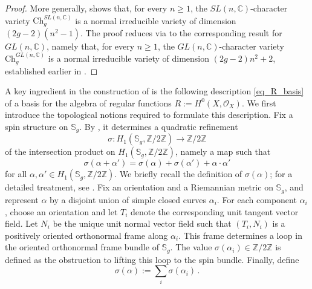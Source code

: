 \documentclass[12pt,letterpaper, reqno]{amsart}
\theoremstyle{defstyle} \newtheorem{definition}[theorem]{Definition}
\theoremstyle{remark}
\numberwithin{equation}{section}
\numberwithin{figure}{section}
\newcommand{\CC} {\mathbb{C}}
\newcommand{\bS} {\mathbb{S}}
\newcommand{\ZZ} {\mathbb{Z}}
\begin{document}
\begin{proof}
More generally, \cite[\S 2.2]{bellamy2023symplectic} shows that, for every $n \geq 1$, the $SL(n,\CC)$-character variety $\mathrm{Ch}_g^{SL(n,\CC)}$ is a normal irreducible variety of dimension $(2g-2)(n^2-1)$. The proof reduces via \cite[Lemma 2.3]{bellamy2023symplectic} 
to the corresponding result for $GL(n,\CC)$, namely that, for every $n \geq 1$, the $GL(n,\CC)$-character variety $\mathrm{Ch}_g^{GL(n,\CC)}$ is a normal irreducible variety of dimension $(2g-2)n^2+2$, established earlier in \cite[Theorem~11.1]{simpson1994moduliII}.
\end{proof}


A key ingredient in the construction of \cite{ayilliath2025geometric} is the following description \eqref{eq_R_basis} of a basis for the algebra of regular functions $R:=H^0(X,\mathcal O_X)$. We first introduce the topological notions required to formulate this description.
Fix a spin structure on $\bS_g$. By \cite{johson1980spin}, it determines a quadratic refinement 
\[ \sigma: H_1(\bS_g, \ZZ/2\ZZ) \rightarrow \ZZ/2\ZZ\] 
of the intersection product on $H_1(\bS_g, \ZZ/2\ZZ)$, namely a map such that
\[ \sigma(\alpha+\alpha')=\sigma(\alpha)+\sigma(\alpha')+\alpha \cdot \alpha'\]
for all $\alpha, \alpha' \in H_1(\bS_g, \ZZ/2\ZZ)$.
We briefly recall the definition of $\sigma(\alpha)$; for a detailed treatment, see \cite{johson1980spin}. Fix an orientation and a Riemannian metric on $\bS_g$, and represent $\alpha$ by a disjoint union of simple closed curves $\alpha_i$. For each component $\alpha_i$, choose an orientation and let $T_i$ denote the corresponding unit tangent vector field. Let $N_i$ be the unique unit normal vector field such that $(T_i,N_i)$ is a positively oriented orthonormal frame along $\alpha_i$. This frame determines a loop in the oriented orthonormal frame bundle of $\bS_g$. The value $\sigma(\alpha_i)\in\mathbb{Z}/2\mathbb{Z}$ is defined as the obstruction to lifting this loop to the spin bundle. Finally, define
\[\sigma(\alpha):=\sum_i \sigma(\alpha_i)\,.\]
\end{document}
